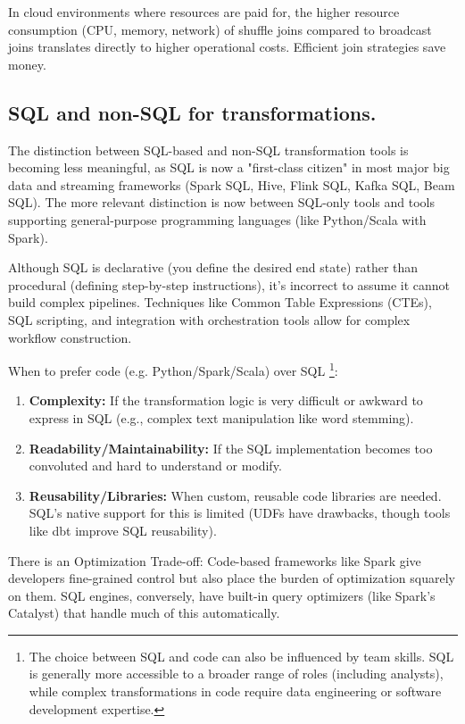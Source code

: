 In cloud environments where resources are paid for, the higher
resource consumption (CPU, memory, network) of shuffle joins
compared to broadcast joins translates directly to higher
operational costs. Efficient join strategies save money.


\subsection*{SQL and non-SQL for transformations.}
The distinction between SQL-based and non-SQL transformation
tools is becoming less meaningful, as SQL is now a
"first-class citizen" in most major big data and streaming
frameworks (Spark SQL, Hive, Flink SQL, Kafka SQL, Beam SQL).
The more relevant distinction is now between SQL-only tools and
tools supporting general-purpose programming languages
(like Python/Scala with Spark).

Although SQL is declarative (you define the desired end state)
rather than procedural (defining step-by-step instructions),
it's incorrect to assume it cannot build complex pipelines.
Techniques like Common Table Expressions (CTEs), SQL scripting,
and integration with orchestration tools allow for complex
workflow construction.

When to prefer code (e.g. Python/Spark/Scala) over SQL
\footnote{
    The choice between SQL and code can also be influenced
    by team skills. SQL is generally more accessible to a
    broader range of roles (including analysts), while
    complex transformations in code require data
    engineering or software development expertise.
}:
\begin{enumerate}
    \item \textbf{Complexity:} If the transformation logic
    is very difficult or awkward to express in SQL
    (e.g., complex text manipulation like word stemming).

    \item \textbf{Readability/Maintainability:}
    If the SQL implementation becomes too convoluted and
    hard to understand or modify.
    
    \item \textbf{Reusability/Libraries:}
    When custom, reusable code libraries are needed.
    SQL's native support for this is limited
    (UDFs have drawbacks, though tools like dbt improve
    SQL reusability).
\end{enumerate}

There is an Optimization Trade-off: Code-based frameworks
like Spark give developers fine-grained control but also
place the burden of optimization squarely on them.
SQL engines, conversely, have built-in query optimizers
(like Spark's Catalyst) that handle much of this
automatically.


